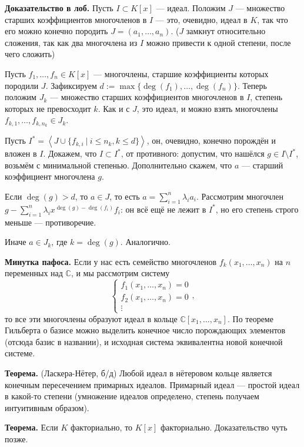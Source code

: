 \QED

\textbf{Доказательство в лоб.} Пусть $I \subset K[x]$ --- идеал.
Положим $J$ --- множество старших коэффициентов многочленов в $I$ --- это, очевидно, идеал в $K$, так что его можно конечно породить $J = (a_1, \dots, a_n)$.
($J$ замкнут относительно сложения, так как два многочлена из $I$ можно привести к одной степени, после чего сложить)

Пусть $f_1, \dots, f_n \in K[x]$ --- многочлены, старшие коэффициенты которых породили $J$.
Зафиксируем $d := \max \{\deg(f_1), \dots, \deg(f_n)\}$.
Теперь положим $J_k$ --- множество старших коэффициентов многочленов в $I$, степень которых не превосходит $k$.
Как и с $J$, это идеал, и можно взять многочлены $f_{k,1}, \dots, f_{k,n_k} \in J_k$.

Пусть $I^* = \left<J \cup \{f_{k,i}~|~i \le n_k, k \le d\} \right>$, он, очевидно, конечно порождён и вложен в $I$.
Докажем, что $I \subset I^*$, от противного: допустим, что нашёлся $g \in I \setminus I^*$, возьмём с минимальной степенью.
Дополнительно скажем, что $a$ --- старший коэффициент многочлена $g$.

Если $\deg(g) > d$, то $a \in J$, то есть $a = \sum_{i=1}^{n} \lambda_i a_i$.
Рассмотрим многочлен $g - \sum_{i=1}^{n} \lambda_i x^{\deg(g) - \deg(f_i)} f_i$: он всё ещё не лежит в $I^*$, но его степень строго меньше --- противоречие.

Иначе $a \in J_k$, где $k = \deg(g)$. Аналогично.

\QED

\textbf{Минутка пафоса.} Если у нас есть семейство многочленов $f_k(x_1, \dots, x_n)$ на $n$ переменных над $\mathbb C$, и мы рассмотрим систему
\[
    \begin{cases}
        f_1(x_1, \dots, x_n) = 0 \\
        f_2(x_1, \dots, x_n) = 0 \\
        \vdots
    \end{cases},
\]
то все эти многочлены образуют идеал в кольце $\mathbb C[x_1, \dots, x_n]$.
По теореме Гильберта о базисе можно выделить конечное число порождающих элементов (отсюда базис в названии), и исходная система эквивалентна новой конечной системе.

\textbf{Теорема.} (Ласкера-Нётер, б/д) Любой идеал в нётеровом кольце является конечным пересечением примарных идеалов.
Примарный идеал --- простой идеал в какой-то степени (умножение идеалов определено, степень получаем интуитивным образом).

\textbf{Теорема.} Если $K$ факториально, то $K[x]$ факториально. Доказательство чуть позже.

